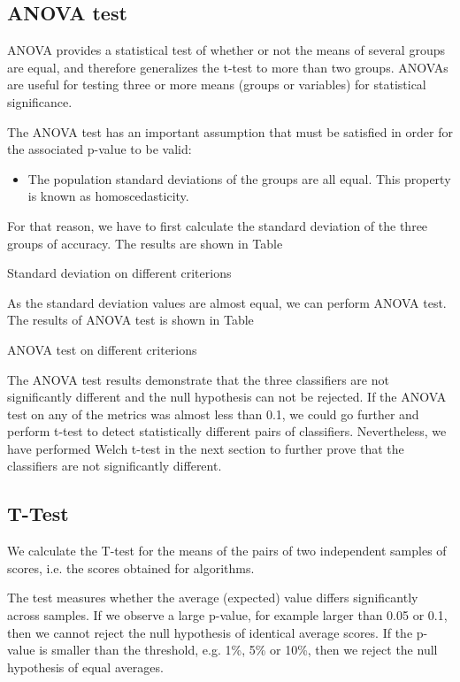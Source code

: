 \subsection{ANOVA test}
 ANOVA provides a statistical test of whether or not the means of several groups are equal, and therefore generalizes the t-test to more than two groups. ANOVAs are useful for testing three or more means (groups or variables) for statistical significance.

The ANOVA test has an important assumption that must be satisfied in order for the associated p-value to be valid:
\begin{itemize}
	\item The population standard deviations of the groups are all equal. This property is known as homoscedasticity.
\end{itemize}

For that reason, we have to first calculate the standard deviation of the three groups of accuracy. The results are shown in Table

\begin{table}
	\centering
	\caption{Standard deviation on different criterions}
	\label{tab:std}
\end{table}

As the standard deviation values are almost equal, we can perform ANOVA test. The results of ANOVA test is shown in Table

\begin{table}
	\centering
	\caption{ANOVA test on different criterions}
	\label{tab:anova}
\end{table}

The ANOVA test results demonstrate that the three classifiers are not significantly different and the null hypothesis can not be rejected. If the ANOVA test on any of the metrics was almost less than 0.1, we could go further and perform t-test to detect statistically different pairs of classifiers. Nevertheless, we have performed Welch t-test in the next section to further prove that the classifiers are not significantly different.

\subsection{T-Test}
We calculate the T-test for the means of the pairs of two independent samples of scores, i.e. the scores obtained for algorithms.

The test measures whether the average (expected) value differs significantly across samples. If we observe a large p-value, for example larger than 0.05 or 0.1, then we cannot reject the null hypothesis of identical average scores. If the p-value is smaller than the threshold, e.g. 1\%, 5\% or 10\%, then we reject the null hypothesis of equal averages.

